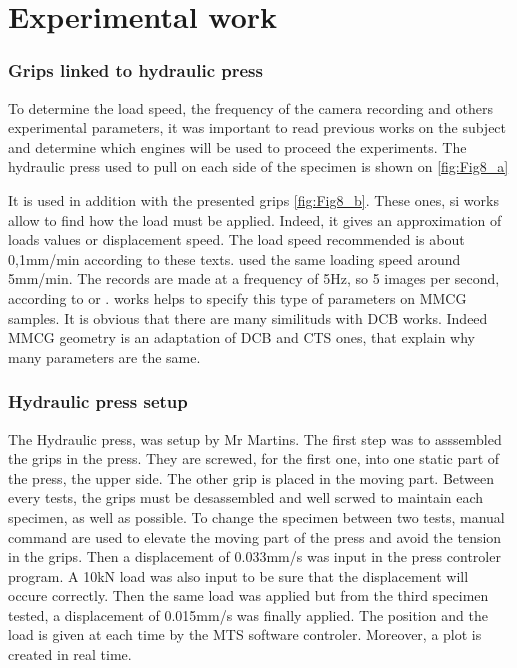 \chapter{Experimental work} %
\label{Chapter2} %

\subsection{Grips linked to hydraulic press}

To determine the load speed, the frequency of the camera recording and others experimental parameters, it was important to read previous works on the subject and determine which engines will be used to proceed the experiments. The hydraulic press used to pull on each side of the specimen is shown on \ref{fig:Fig8_a}

It is used in addition with the presented grips \ref{fig:Fig8_b}. These ones, si
\parencite{Reference17} works allow to find how the load must be applied. Indeed, it gives an approximation of loads values or displacement speed. The load speed recommended is about 0,1mm/min according to these texts. \parencite{Reference7} used the same loading speed around 5mm/min. The records are made at a frequency of 5Hz, so 5 images per second, according to \parencite{Reference17} or \parencite{Reference16}.
\parencite{Reference7} works helps to specify this type of parameters on MMCG samples. It is obvious that there are many similituds with DCB works. Indeed MMCG geometry is an adaptation of DCB and CTS ones, that explain why many parameters are the same.

\subsection{Hydraulic press setup}

The Hydraulic press, was setup by Mr Martins. The first step was to asssembled the grips in the press. They are screwed, for the first one, into one static part of the press, the upper side. The other grip is placed in the moving part. Between every tests, the grips must be desassembled and well scrwed to maintain each specimen, as well as possible. To change the specimen between two tests, manual command are used to elevate the moving part of the press and avoid the tension in the grips.
Then a displacement of 0.033mm/s was input in the press controler program. A 10kN load was also input to be sure that the displacement will occure correctly. Then the same load was applied but from the third specimen tested, a displacement of 0.015mm/s was finally applied. The position and the load is given at each time by the MTS software controler. Moreover, a plot is created in real time.

